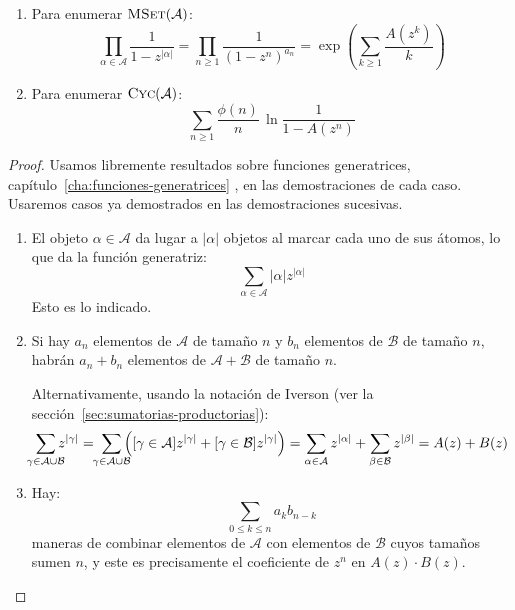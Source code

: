 \begin{theorem}
\begin{enumerate}
    \item
      Para enumerar \(\operatorname{\textsc{MSet}}(\mathcal{A})\):
      \begin{equation*}
	\prod_{\alpha \in \mathcal{A}}
	   \frac{1}{1 - z^{\lvert \alpha \rvert}}
	  = \prod_{n \ge 1} \frac{1}{(1 - z^n)^{a_n}}
	  = \exp\left(
		   \sum_{k \ge 1} \frac{A(z^k)}{k}
		\right)
      \end{equation*}
    \item
      Para enumerar \(\operatorname{\textsc{Cyc}}(\mathcal{A})\):
      \begin{equation*}
	\sum_{n \ge 1} \frac{\phi(n)}{n} \, \ln \frac{1}{1 - A(z^n)}
      \end{equation*}
    \end{enumerate}
  \end{theorem}
  \begin{proof}
    Usamos libremente resultados sobre funciones generatrices,
    capítulo~\ref{cha:funciones-generatrices}%
      ,
    en las demostraciones de cada caso.
    Usaremos casos ya demostrados en las demostraciones sucesivas.
    \begin{enumerate}
    \item %
      El objeto \(\alpha \in \mathcal{A}\)
      da lugar a \(\lvert \alpha \rvert\) objetos
      al marcar cada uno de sus átomos,
      lo que da la función generatriz:
      \begin{equation*}
	\sum_{\alpha \in \mathcal{A}}
	  \lvert \alpha \rvert z^{\lvert \alpha \rvert}
      \end{equation*}
      Esto es lo indicado.
    \item %
      Si hay \(a_n\) elementos de \(\mathcal{A}\) de tamaño \(n\)
      y \(b_n\) elementos de \(\mathcal{B}\) de tamaño \(n\),
      habrán \(a_n + b_n\) elementos
      de \(\mathcal{A} + \mathcal{B}\)
      de tamaño \(n\).

      Alternativamente,
      usando la notación de Iverson
      (ver la sección~\ref{sec:sumatorias-productorias}):%
      \begin{equation*}
	\sum_{\mathclap{\gamma \in \mathcal{A} \cup \mathcal{B}}}
	  z^{\lvert \gamma \rvert}
	  = \; \sum_{\mathclap{\gamma \in \mathcal{A}
					    \cup \mathcal{B}}}
		 \left(
		   [\gamma \in \mathcal{A}]
		     z^{\lvert \gamma \rvert}
		      + [\gamma \in \mathcal{B}]
			  z^{\lvert \gamma \rvert}
		 \right)
	  = \sum_{\alpha \in \mathcal{A}} z^{\lvert \alpha \rvert}
	      + \sum_{\beta \in \mathcal{B}}
		  z^{\lvert \beta \rvert}
	  = A(z) + B(z)
      \end{equation*}
    \item %
      Hay:
      \begin{equation*}
	\sum_{0 \le k \le n} a_k b_{n - k}
      \end{equation*}
      maneras de combinar elementos de \(\mathcal{A}\)
      con elementos de \(\mathcal{B}\) cuyos tamaños sumen \(n\),
      y este es precisamente
      el coeficiente de \(z^n\) en \(A(z) \cdot B(z)\).


\end{enumerate}
\end{proof}
